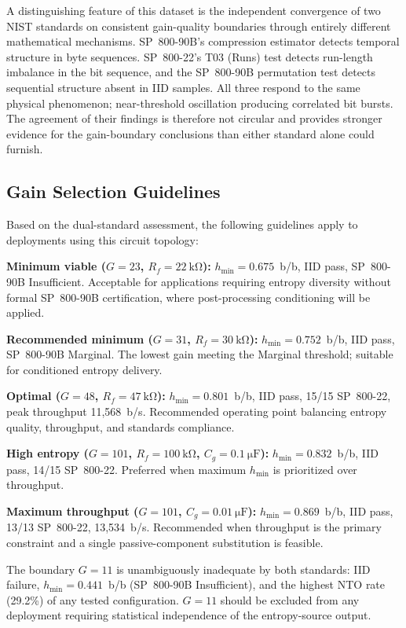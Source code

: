 \documentclass[conference]{IEEEtran}
\newcommand{\hmin}{\ensuremath{h_{\min}}}
\newcommand{\Cg}{\ensuremath{C_g}}
\newcommand{\Rf}{\ensuremath{R_f}}
\begin{document}
A distinguishing feature of this dataset is the independent
convergence of two NIST standards on consistent gain-quality
boundaries through entirely different mathematical mechanisms.
SP~800-90B's compression estimator detects temporal structure in
byte sequences. SP~800-22's T03 (Runs) test detects run-length
imbalance in the bit sequence, and the SP~800-90B permutation test
detects sequential structure absent in IID samples. All three respond to the same physical phenomenon; near-threshold oscillation producing correlated bit bursts. The agreement of
their findings is therefore not circular and provides stronger
evidence for the gain-boundary conclusions than either standard alone
could furnish.

\subsection{Gain Selection Guidelines}

Based on the dual-standard assessment, the following guidelines apply
to deployments using this circuit topology:

\textbf{Minimum viable ($G=23$, $\Rf=\SI{22}{\kilo\ohm}$):}
$\hmin=0.675$~b/b, IID pass, SP~800-90B Insufficient. Acceptable for
applications requiring entropy diversity without formal SP~800-90B
certification, where post-processing conditioning will be applied.

\textbf{Recommended minimum ($G=31$, $\Rf=\SI{30}{\kilo\ohm}$):}
$\hmin=0.752$~b/b, IID pass, SP~800-90B Marginal. The lowest gain
meeting the Marginal threshold; suitable for conditioned entropy
delivery.

\textbf{Optimal ($G=48$, $\Rf=\SI{47}{\kilo\ohm}$):} $\hmin=0.801$~b/b,
IID pass, 15/15 SP~800-22, peak throughput 11{,}568~b/s. Recommended
operating point balancing entropy quality, throughput, and standards
compliance.

\textbf{High entropy ($G=101$, $\Rf=\SI{100}{\kilo\ohm}$,
$\Cg=\SI{0.1}{\micro\farad}$):} $\hmin=0.832$~b/b, IID pass, 14/15
SP~800-22. Preferred when maximum $\hmin$ is prioritized over
throughput.

\textbf{Maximum throughput ($G=101$, $\Cg=\SI{0.01}{\micro\farad}$):}
$\hmin=0.869$~b/b, IID pass, 13/13 SP~800-22, 13{,}534~b/s.
Recommended when throughput is the primary constraint and a single
passive-component substitution is feasible.

The boundary $G=11$ is unambiguously inadequate by both standards:
IID failure, $\hmin=0.441$~b/b (SP~800-90B Insufficient), and the
highest NTO rate (29.2\%) of any tested configuration. $G=11$
should be excluded from any deployment requiring statistical
independence of the entropy-source output.
\end{document}
